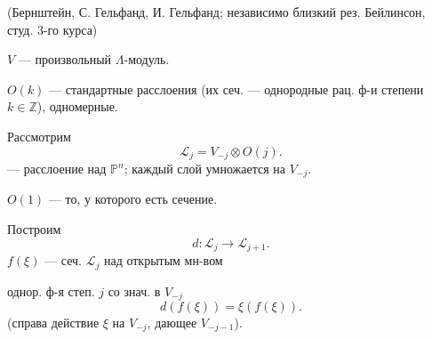 (Бернштейн, С. Гельфанд, И. Гельфанд;
независимо близкий рез. Бейлинсон, студ. 3-го курса)


\(V\) --- произвольный \(\Lambda\)-модуль.

\(O(k)\) --- стандартные расслоения
(их сеч. — однородные рац. ф-и степени \(k\in\mathbb Z\)), одномерные.

Рассмотрим
\begin{equation*}
\mathcal L_j=V_{-j}\otimes O(j).
\tag{8}
\end{equation*}
--- расслоение над \(\mathbb P^n\);
каждый слой умножается на \(V_{-j}\).

\(O(1)\) --- то, у которого есть сечение.

Построим
\begin{equation*}
d:\mathcal L_j\longrightarrow\mathcal L_{j+1}.
\tag{9}
\end{equation*}
\(f(\xi)\) --- сеч. \(\mathcal L_j\) над открытым мн-вом

однор. ф-я степ. \(j\) со знач. в \(V_{-j}\)
\begin{equation*}
d(f(\xi))=\xi(f(\xi)).
\tag{10}
\end{equation*}
(справа действие \(\xi\) на \(V_{-j}\), дающее \(V_{-j-1}\)).


